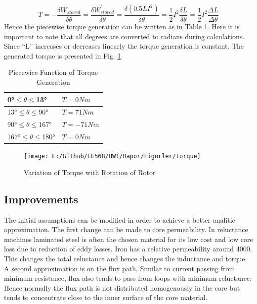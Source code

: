 \documentclass{article}
\begin{document}
\begin{equation}
T=-\frac{\delta W_{stored}}{\delta\theta}=\frac{\delta W^{'}_{stored}}{\delta\theta}=\frac{\delta(0.5LI^2)}{\delta\theta}=\frac{1}{2}I^2\frac{\delta L}{\delta\theta}=\frac{1}{2}I^2\frac{\Delta L}{\Delta\theta}
\label{torqueformula}
\end{equation}
Hence the piecewise torque generation can be written as in Table \ref{torquetable}. Here it is important to note that all degrees are converted to radians during calculations. Since \enquote{L} increases or decreases linearly the torque generation is constant. The generated torque is presented in Fig. \ref{fig:torqueanalitic}.
	\begin{table}[h!]
	\centering
	\caption{Piecewice Function of Torque Generation}
	\label{torquetable}
	\begin{tabular}{ll}		
		\hline
		\ang{0}$\leq$$\theta$$\leq$\ang{13}	& $T=0 Nm$ \\ \hline
		\ang{13}$\leq$$\theta$$\leq$\ang{90}	& $T=71 Nm$ \\ \hline
		\ang{90}$\leq$$\theta$$\leq$\ang{167}	& $T=-71 Nm$ \\ \hline
		\ang{167}$\leq$$\theta$$\leq$\ang{180}	& $T=0 Nm$ \\ \hline
	\end{tabular}	
\end{table}
\begin{figure}[H]
	\centering
	\texttt{[image: E:/Github/EE568/HW1/Rapor/Figurler/torque]}
	\caption{Variation of Torque with Rotation of Rotor}
	\label{fig:torqueanalitic}
\end{figure}

\subsection{Improvements}
The initial assumptions can be modified in order to achieve a better analitic approximation. The first change can be made to core permeability. In reluctance machines laminated steel is often the chosen material for its low cost and low core loss due to reduction of eddy losses. Iron has a relative permeability around 4000. This changes the total reluctance and hence changes the inductance and torque. A second approximation is on the flux path. Similar to current passing from minimum resistance, flux also tends to pass from loops with minimum reluctance. Hence normally the flux path is not distributed homogenously in the core but tends to concentrate close to the inner surface of the core material. 
\end{document}
